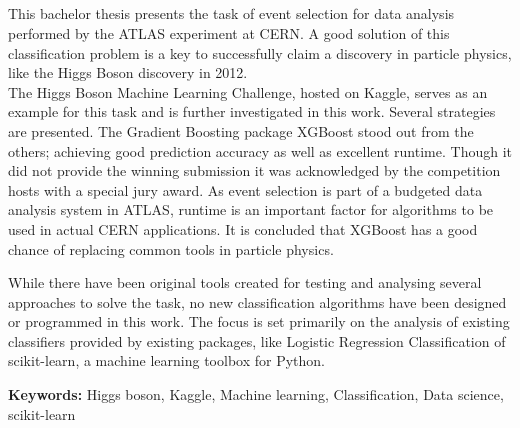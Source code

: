 \begin{titlepage}
\vspace*{\fill}

\section*{}
This bachelor thesis presents the task of event selection for data analysis performed by the ATLAS experiment at CERN. A good solution of this classification problem is a key to successfully claim a discovery in particle physics, like the Higgs Boson discovery in 2012.\\
The Higgs Boson Machine Learning Challenge, hosted on Kaggle, serves as an example for this task and is further investigated in this work. Several strategies are presented. The Gradient Boosting package XGBoost stood out from the others; achieving good prediction accuracy as well as excellent runtime. Though it did not provide the winning submission it was acknowledged by the competition hosts with a special jury award.
As event selection is part of a budgeted data analysis system in ATLAS, runtime is an important factor for algorithms to be used in actual CERN applications. It is concluded that XGBoost has a good chance of replacing common tools in particle physics.

While there have been original tools created for testing and analysing several approaches to solve the task, no new classification algorithms have been designed or programmed in this work. The focus is set primarily on the analysis of existing classifiers provided by existing packages, like Logistic Regression Classification of scikit-learn, a machine learning toolbox for Python. 

\vspace{25 mm}

\textbf{Keywords:} Higgs  boson, Kaggle, Machine learning, Classification, Data science, scikit-learn

\vspace*{\fill}
\end{titlepage}
